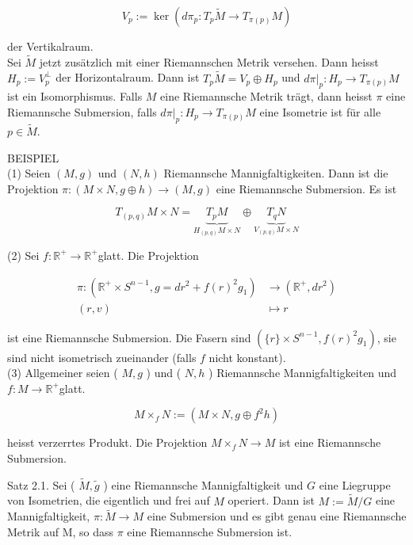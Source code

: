 \documentclass[10pt]{article}
\begin{document}
$$
V_{p}:=\operatorname{ker}\left(d \pi_{p}: T_{p} \tilde{M} \rightarrow T_{\pi(p)} M\right)
$$

der Vertikalraum.\\
Sei $\tilde{M}$ jetzt zusätzlich mit einer Riemannschen Metrik versehen. Dann heisst $H_{p}:=V_{p}^{\perp}$ der Horizontalraum. Dann ist $T_{p} \tilde{M}=V_{p} \oplus H_{p}$ und $\left.d \pi\right|_{p}: H_{p} \rightarrow T_{\pi(p)} M$ ist ein Isomorphismus. Falls $M$ eine Riemannsche Metrik trägt, dann heisst $\pi$ eine Riemannsche Submersion, falls $\left.d \pi\right|_{p}: H_{p} \rightarrow T_{\pi(p)} M$ eine Isometrie ist für alle $p \in \tilde{M}$.

BEISPIEL\\
(1) Seien $(M, g)$ und $(N, h)$ Riemannsche Mannigfaltigkeiten. Dann ist die Projektion $\pi:(M \times N, g \oplus h) \rightarrow(M, g)$ eine Riemannsche Submersion. Es ist

$$
T_{(p, q)} M \times N=\underbrace{T_{p} M}_{H_{(p, q)} M \times N} \oplus \underbrace{T_{q} N}_{V_{(p, q)} M \times N}
$$

(2) Sei $f: \mathbb{R}^{+} \rightarrow \mathbb{R}^{+}$glatt. Die Projektion

$$
\begin{aligned}
\pi:\left(\mathbb{R}^{+} \times S^{n-1}, g=d r^{2}+f(r)^{2} g_{1}\right) & \rightarrow\left(\mathbb{R}^{+}, d r^{2}\right) \\
(r, v) & \mapsto r
\end{aligned}
$$

ist eine Riemannsche Submersion. Die Fasern sind $\left(\{r\} \times S^{n-1}, f(r)^{2} g_{1}\right)$, sie sind nicht isometrisch zueinander (falls $f$ nicht konstant).\\
(3) Allgemeiner seien ( $M, g$ ) und ( $N, h$ ) Riemannsche Mannigfaltigkeiten und $f: M \rightarrow \mathbb{R}^{+}$glatt.

$$
M \times_{f} N:=\left(M \times N, g \oplus f^{2} h\right)
$$

heisst verzerrtes Produkt. Die Projektion $M \times_{f} N \rightarrow M$ ist eine Riemannsche Submersion.

Satz 2.1. Sei ( $\tilde{M}, \tilde{g}$ ) eine Riemannsche Mannigfaltigkeit und $G$ eine Liegruppe von Isometrien, die eigentlich und frei auf $M$ operiert. Dann ist $M:=\tilde{M} / G$ eine Mannigfaltigkeit, $\pi: \tilde{M} \rightarrow M$ eine Submersion und es gibt genau eine Riemannsche Metrik auf M, so dass $\pi$ eine Riemannsche Submersion ist.
\end{document}
